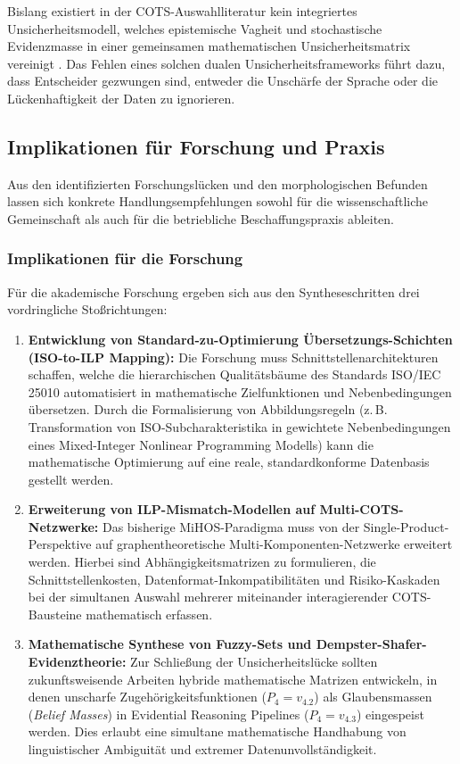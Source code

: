 Bislang existiert in der COTS-Auswahlliteratur kein integriertes Unsicherheitsmodell, welches epistemische Vagheit und stochastische Evidenzmasse in einer gemeinsamen mathematischen Unsicherheitsmatrix vereinigt \cite{LPC92LAP}. Das Fehlen eines solchen dualen Unsicherheitsframeworks führt dazu, dass Entscheider gezwungen sind, entweder die Unschärfe der Sprache oder die Lückenhaftigkeit der Daten zu ignorieren.

\subsection{Implikationen für Forschung und Praxis}
\label{subsec:implikationen}

Aus den identifizierten Forschungslücken und den morphologischen Befunden lassen sich konkrete Handlungsempfehlungen sowohl für die wissenschaftliche Gemeinschaft als auch für die betriebliche Beschaffungspraxis ableiten.

\subsubsection{Implikationen für die Forschung}

Für die akademische Forschung ergeben sich aus den Syntheseschritten drei vordringliche Stoßrichtungen:

\begin{enumerate}
    \item \textbf{Entwicklung von Standard-zu-Optimierung Übersetzungs-Schichten (ISO-to-ILP Mapping):} Die Forschung muss Schnittstellenarchitekturen schaffen, welche die hierarchischen Qualitätsbäume des Standards ISO/IEC 25010 automatisiert in mathematische Zielfunktionen und Nebenbedingungen übersetzen. Durch die Formalisierung von Abbildungsregeln (z.\,B. Transformation von ISO-Subcharakteristika in gewichtete Nebenbedingungen eines Mixed-Integer Nonlinear Programming Modells) kann die mathematische Optimierung auf eine reale, standardkonforme Datenbasis gestellt werden.
    
    \item \textbf{Erweiterung von ILP-Mismatch-Modellen auf Multi-COTS-Netzwerke:} Das bisherige MiHOS-Paradigma muss von der Single-Product-Perspektive auf graphentheoretische Multi-Komponenten-Netzwerke erweitert werden. Hierbei sind Abhängigkeitsmatrizen zu formulieren, die Schnittstellenkosten, Datenformat-Inkompatibilitäten und Risiko-Kaskaden bei der simultanen Auswahl mehrerer miteinander interagierender COTS-Bausteine mathematisch erfassen.
    
    \item \textbf{Mathematische Synthese von Fuzzy-Sets und Dempster-Shafer-Evidenztheorie:} Zur Schließung der Unsicherheitslücke sollten zukunftsweisende Arbeiten hybride mathematische Matrizen entwickeln, in denen unscharfe Zugehörigkeitsfunktionen ($P_4 = v_{4.2}$) als Glaubensmassen (\textit{Belief Masses}) in Evidential Reasoning Pipelines ($P_4 = v_{4.3}$) eingespeist werden. Dies erlaubt eine simultane mathematische Handhabung von linguistischer Ambiguität und extremer Datenunvollständigkeit.
\end{enumerate}

